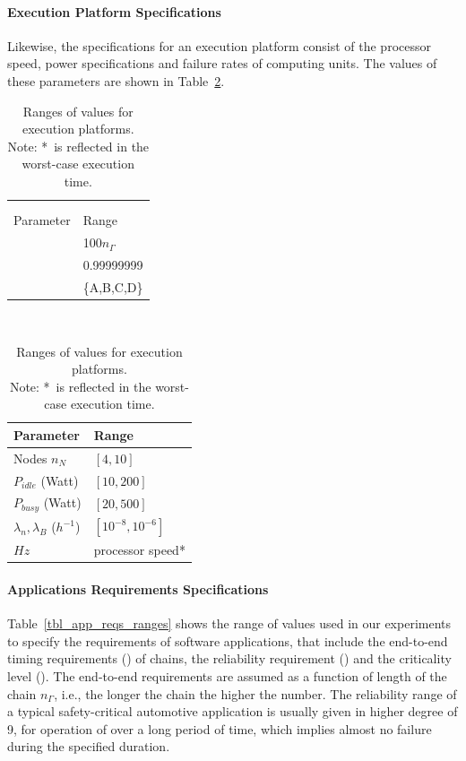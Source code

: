 \paragraph{Execution Platform Specifications}
Likewise, the specifications for an execution platform consist of the processor speed, power specifications and failure rates of computing units. The values of these parameters are shown in Table~\ref{tbl_execpla}.
\begin{table}
	\small
	\parbox{.4\linewidth}{
		\centering
		\begin{tabular}{@{}ll@{}}
			&\\&\\
			\toprule
			Parameter  			& Range\\ 
			\midrule
			\ttEE					 	& 100$n_\Gamma$\\
			\ttRL 						& 0.99999999\\
			\ttCL 						& \{A,B,C,D\}\\
			\bottomrule
		\end{tabular}
		\caption{Ranges of values for applications requirements.}
		\label{tbl_app_reqs_ranges}
	}
~
	\parbox{.6\linewidth}{
		\centering\raggedbottom
		\begin{tabular}{@{}ll@{}}
			\toprule
			Parameter  		& Range\\ 
			\midrule
			Nodes $n_N$							& $[4,10]$\\
			$P_{idle}$ (Watt)	& $[10,200]$\\
			$P_{busy}$ (Watt)	& $[20,500]$\\
			$\lambda_n,\lambda_B$ ($h^{-1}$) 	& $[10^{-8},10^{-6}]$\\
			$Hz$ & processor speed*\\
			\bottomrule
		\end{tabular}
		\caption{Ranges of values for execution platforms. \\Note: *~is reflected in the worst-case execution time.}
		\label{tbl_execpla}
	}
\end{table}

\paragraph{Applications Requirements Specifications} Table~\ref{tbl_app_reqs_ranges}  shows the range of values used in our experiments to specify the requirements of software applications, that include the end-to-end timing requirements (\ttEE) of chains, the reliability requirement (\ttRL) and the criticality level (\ttCL). The end-to-end requirements are assumed as a function of length of the chain $n_\Gamma$, i.e., the longer the chain the higher the number. The reliability range of a typical safety-critical automotive application is usually given in higher degree of 9, for operation of over a long period of time, which implies almost no failure during the specified duration.

